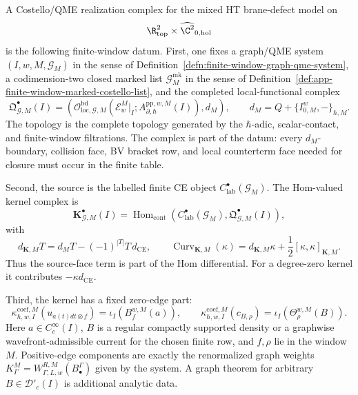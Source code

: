 \begin{defn}
\label{def:app-native-finite-window-realization-complex}
  A Costello/QME realization complex for the mixed HT brane-defect
  model on
  \[
    \R^2_{\mathrm{top}}\times\widehat{\C^2}_{0,\mathrm{hol}}
  \]
  is the following finite-window datum.  First, one fixes a graph/QME
  system \((I,w,M,\mathcal G_M)\) in the sense of
  Definition~\ref{defn:finite-window-graph-qme-system}, a
  codimension-two closed marked list
  \(\mathcal G^{\mathrm{mk}}_M\) in the sense of
  Definition~\ref{def:app-finite-window-marked-costello-list}, and the
  completed local-functional complex
  \[
    \mathfrak Q^\bullet_{\mathcal G,M}(I)
      =
    \left(
      \mathcal O^{\mathrm{bd}}_{\mathrm{loc},\mathcal G,M}
      (\mathcal E_w^M|_I;
       A^{\mathrm{pp},w,M}_{\partial,\hbar}(I)),
      d_M
    \right),
    \qquad
    d_M=Q+\{I^w_{0,M},-\}_{\hbar,M}.
  \]
  The topology is the complete topology generated by the \(\hbar\)-adic,
  scalar-contact, and finite-window filtrations.  The complex is part of
  the datum: every \(d_M\)-boundary, collision face, BV bracket row, and
  local counterterm face needed for closure must occur in the finite
  table.

  Second, the source is the labelled finite CE object
  \(C^\bullet_{\mathrm{lab}}(\mathcal G_M)\).  The Hom-valued kernel
  complex is
  \[
    \mathbf K^\bullet_{\mathcal G,M}(I)
      =
    \operatorname{Hom}_{\mathrm{cont}}
    \left(
      C^\bullet_{\mathrm{lab}}(\mathcal G_M),
      \mathfrak Q^\bullet_{\mathcal G,M}(I)
    \right),
  \]
  with
  \[
    d_{\mathbf K,M}T
      =
    d_M T-(-1)^{|T|}T\,d_{\mathrm{CE}},
    \qquad
    \operatorname{Curv}_{\mathbf K,M}(\kappa)
      =
    d_{\mathbf K,M}\kappa+\frac12[\kappa,\kappa]_{\mathbf K,M}.
  \]
  Thus the source-face term is part of the Hom differential.  For a degree-zero kernel it
  contributes \(-\kappa d_{\mathrm{CE}}\).

  Third, the kernel has a fixed zero-edge part:
  \[
    \kappa^{\mathrm{coef},M}_{\hbar,w,I}(u_{a(t)dt\otimes f})
      =
    \iota_I(B^{w,M}_f(a)),
    \qquad
    \kappa^{\mathrm{coef},M}_{\hbar,w,I}(c_{B,\rho})
      =
    \iota_I(\Theta^{w,M}_\rho(B)).
  \]
  Here \(a\in C^\infty_c(I)\), \(B\) is a regular compactly supported
  density or a graphwise wavefront-admissible current for the chosen
  finite row, and \(f,\rho\) lie in the window \(M\).  Positive-edge
  components are exactly the renormalized graph weights
  \(K^M_\Gamma=W^{R,M}_{\Gamma,L,w}(B^\Gamma_\bullet)\) given by the
  system.  A graph theorem for arbitrary \(B\in\mathcal D'_c(I)\) is
  additional analytic data.


\end{defn}
